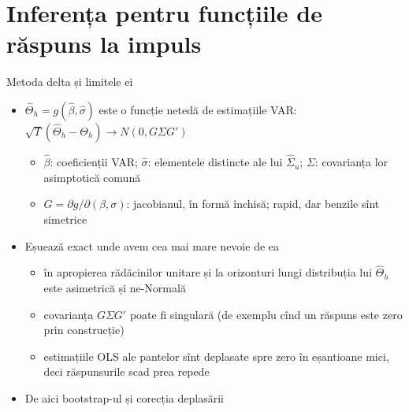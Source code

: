 \section{Inferența pentru funcțiile de răspuns la impuls}

\begin{frame}{Metoda delta și limitele ei}
\itemsize{\small}
\begin{itemize}
    \item $\hat\Theta_h = g(\hat\beta, \hat\sigma)$ este o funcție netedă de estimațiile VAR: $\sqrt T(\hat\Theta_h - \Theta_h) \to N(0, G\Sigma G')$ 
    \begin{itemize}
        \item $\hat\beta$: coeficienții VAR; $\hat\sigma$: elementele distincte ale lui $\hat\Sigma_u$; $\Sigma$: covarianța lor asimptotică comună
        \item $G = \partial g/\partial(\beta, \sigma)$: jacobianul, în formă închisă; rapid, dar benzile sînt simetrice
    \end{itemize}
    \item Eșuează exact unde avem cea mai mare nevoie de ea
    \begin{itemize}
        \item în apropierea rădăcinilor unitare și la orizonturi lungi distribuția lui $\hat\Theta_h$ este asimetrică și ne-Normală
        \item covarianța $G\Sigma G'$ poate fi singulară (de exemplu cînd un răspuns este zero prin construcție)
        \item estimațiile OLS ale pantelor sînt deplasate spre zero în eșantioane mici, deci răspunsurile scad prea repede
    \end{itemize}
    \item De aici bootstrap-ul și corecția deplasării
\end{itemize}
\end{frame}

